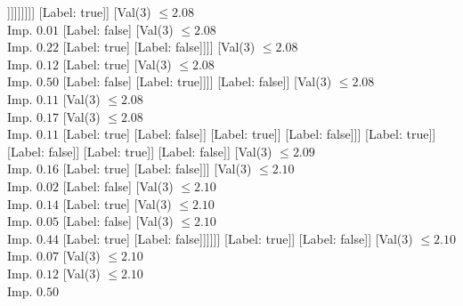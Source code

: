 \documentclass[margin=10pt]{standalone}
\begin{document}
\begin{forest}
																													[Label: true]
																													[Val($3$) $ \leq 2.07$ \\ Imp. $0.05$
																														[Label: false]
																														[Val($3$) $ \leq 2.07$ \\ Imp. $0.44$
																															[Label: true]
																															[Label: false]]]]]]]]]
																							[Label: true]]
																						[Val($3$) $ \leq 2.08$ \\ Imp. $0.01$
																							[Label: false]
																							[Val($3$) $ \leq 2.08$ \\ Imp. $0.22$
																								[Label: true]
																								[Label: false]]]]
																					[Val($3$) $ \leq 2.08$ \\ Imp. $0.12$
																						[Label: true]
																						[Val($3$) $ \leq 2.08$ \\ Imp. $0.50$
																							[Label: false]
																							[Label: true]]]]
																				[Label: false]]
																			[Val($3$) $ \leq 2.08$ \\ Imp. $0.11$
																				[Val($3$) $ \leq 2.08$ \\ Imp. $0.17$
																					[Val($3$) $ \leq 2.08$ \\ Imp. $0.11$
																						[Label: true]
																						[Label: false]]
																					[Label: true]]
																				[Label: false]]]
																		[Label: true]]
																	[Label: false]]
																[Label: true]]
															[Label: false]]
														[Val($3$) $ \leq 2.09$ \\ Imp. $0.16$
															[Label: true]
															[Label: false]]]
													[Val($3$) $ \leq 2.10$ \\ Imp. $0.02$
														[Label: false]
														[Val($3$) $ \leq 2.10$ \\ Imp. $0.14$
															[Label: true]
															[Val($3$) $ \leq 2.10$ \\ Imp. $0.05$
																[Label: false]
																[Val($3$) $ \leq 2.10$ \\ Imp. $0.44$
																	[Label: true]
																	[Label: false]]]]]]
												[Label: true]]
											[Label: false]]
										[Val($3$) $ \leq 2.10$ \\ Imp. $0.07$
											[Val($3$) $ \leq 2.10$ \\ Imp. $0.12$
												[Val($3$) $ \leq 2.10$ \\ Imp. $0.50$

\end{forest}
\end{document}
